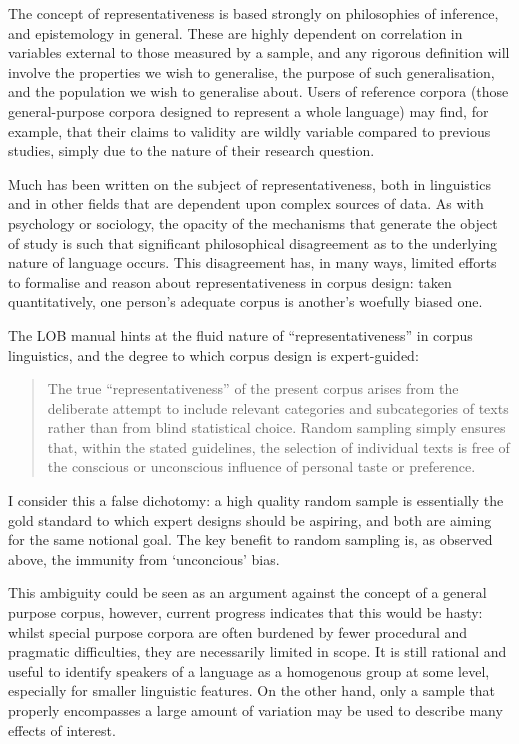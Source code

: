 The concept of representativeness is based strongly on philosophies of inference, and epistemology in general.  These are highly dependent on correlation in variables external to those measured by a sample, and any rigorous definition will involve the properties we wish to generalise, the purpose of such generalisation, and the population we wish to generalise about.  Users of reference corpora (those general-purpose corpora designed to represent a whole language) may find, for example, that their claims to validity are wildly variable compared to previous studies, simply due to the nature of their research question.


Much has been written on the subject of representativeness\cite{biber1993using,varadi2001linguistic,varadi2000corpus,leech1992corpora,rapp2014using}, both in linguistics and in other fields that are dependent upon complex sources of data.  As with psychology or sociology, the opacity of the mechanisms that generate the object of study is such that significant philosophical disagreement as to the underlying nature of language occurs.  This disagreement has, in many ways, limited efforts to formalise and reason about representativeness in corpus design: taken quantitatively, one person's adequate corpus is another's woefully biased one.

The LOB manual hints at the fluid nature of ``representativeness'' in corpus linguistics, and the degree to which corpus design is expert-guided\cite{johansson1986tagged}:
\begin{quote}
The true “representativeness” of the present corpus arises from the deliberate attempt to include relevant categories and subcategories of texts rather than from blind statistical choice. Random sampling simply ensures that, within the stated guidelines, the selection of individual texts is free of the conscious or unconscious influence of personal taste or preference.
\end{quote}

I consider this a false dichotomy: a high quality random sample is essentially the gold standard to which expert designs should be aspiring, and both are aiming for the same notional goal.  The key benefit to random sampling is, as observed above, the immunity from `unconcious' bias.

This ambiguity could be seen as an argument against the concept of a general purpose corpus, however, current progress indicates that this would be hasty: whilst special purpose corpora are often burdened by fewer procedural and pragmatic difficulties, they are necessarily limited in scope.  It is still rational and useful to identify speakers of a language as a homogenous group at some level, especially for smaller linguistic features.  On the other hand, only a sample that properly encompasses a large amount of variation may be used to describe many effects of interest.

